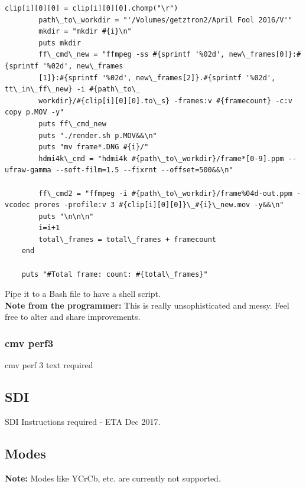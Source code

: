 \begin{lstlisting}[breaklines=true, breakatwhitespace=true]
    	clip[i][0][0] = clip[i][0][0].chomp("\r")
    	path\_to\_workdir = "'/Volumes/getztron2/April Fool 2016/V'"
    	mkdir = "mkdir #{i}\n"
    	puts mkdir
    	ff\_cmd\_new = "ffmpeg -ss #{sprintf '%02d', new\_frames[0]}:#{sprintf '%02d', new\_frames
    	[1]}:#{sprintf '%02d', new\_frames[2]}.#{sprintf '%02d', tt\_in\_ff\_new} -i #{path\_to\_
    	workdir}/#{clip[i][0][0].to\_s} -frames:v #{framecount} -c:v copy p.MOV -y"
    	puts ff\_cmd_new
    	puts "./render.sh p.MOV&&\n"
    	puts "mv frame*.DNG #{i}/"
    	hdmi4k\_cmd = "hdmi4k #{path\_to\_workdir}/frame*[0-9].ppm --ufraw-gamma --soft-film=1.5 --fixrnt --offset=500&&\n"
     
    	ff\_cmd2 = "ffmpeg -i #{path\_to\_workdir}/frame%04d-out.ppm -vcodec prores -profile:v 3 #{clip[i][0][0]}\_#{i}\_new.mov -y&&\n"
    	puts "\n\n\n"
    	i=i+1
    	total\_frames = total\_frames + framecount
    end
     
    puts "#Total frame: count: #{total\_frames}"
\end{lstlisting}


Pipe it to a Bash file to have a shell script.\\

\textbf{Note from the programmer:} This is really unsophisticated and messy. Feel free to alter and share improvements. 




\subsubsection{cmv perf3}

cmv perf 3 text required





\subsection{SDI}

SDI Instructions required - ETA Dec 2017.





\subsection{Modes}

\textbf{Note:} Modes like YCrCb, etc. are currently not supported. 





